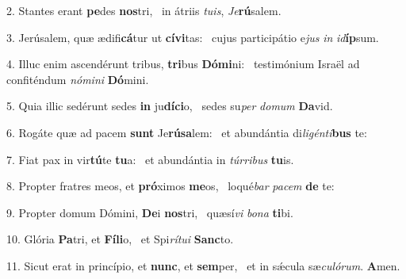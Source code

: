 2. Stantes erant \textbf{pe}des \textbf{nos}tri, \ast\  in átriis \textit{tu}\textit{is}, \textit{Je}\textbf{rú}salem.\

3. Jerúsalem, quæ ædifi\textbf{cá}tur ut \textbf{cí}\textbf{vi}tas: \ast\  cujus participátio e\textit{jus} \textit{in} \textit{id}\textbf{íp}sum.\

4. Illuc enim ascendérunt tribus, \textbf{tri}bus \textbf{Dó}\textbf{mi}ni: \ast\  testimónium Israël ad confiténdum \textit{nó}\textit{mi}\textit{ni} \textbf{Dó}mini.\

5. Quia illic sedérunt sedes \textbf{in} ju\textbf{dí}\textbf{ci}o, \ast\  sedes su\textit{per} \textit{do}\textit{mum} \textbf{Da}vid.\

6. Rogáte quæ ad pacem \textbf{sunt} Je\textbf{rú}\textbf{sa}lem: \ast\  et abundántia di\textit{li}\textit{gén}\textit{ti}\textbf{bus} te:\

7. Fiat pax in vir\textbf{tú}te \textbf{tu}a: \ast\  et abundántia in \textit{túr}\textit{ri}\textit{bus} \textbf{tu}is.\

8. Propter fratres meos, et \textbf{pró}ximos \textbf{me}os, \ast\  loqué\textit{bar} \textit{pa}\textit{cem} \textbf{de} te:\

9. Propter domum Dómini, \textbf{De}i \textbf{nos}tri, \ast\  quæsí\textit{vi} \textit{bo}\textit{na} \textbf{ti}bi.\

10. Glória \textbf{Pa}tri, et \textbf{Fí}\textbf{li}o, \ast\  et Spi\textit{rí}\textit{tu}\textit{i} \textbf{Sanc}to.\

11. Sicut erat in princípio, et \textbf{nunc}, et \textbf{sem}per, \ast\  et in sǽcula sæ\textit{cu}\textit{ló}\textit{rum}. \textbf{A}men.\

